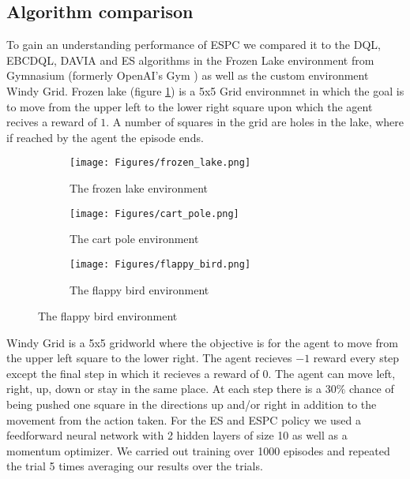\subsection{Algorithm comparison}
To gain an understanding performance of ESPC we compared it to the DQL, EBCDQL, DAVIA and ES algorithms in the Frozen Lake environment from Gymnasium (formerly OpenAI's Gym \cite{Gym}) as well as the custom environment Windy Grid. Frozen lake (figure \ref{fig:FrozenLake}) is a 5x5 Grid environmnet in which the goal is to move from the upper left to the lower right square upon which the agent recives a reward of $1$. A number of squares in the grid are holes in the lake, where if reached by the agent the episode ends. 

\begin{figure}
    \centering
    \begin{subfigure}{0.4\textwidth}
        \centering
        \texttt{[image: Figures/frozen\_lake.png]}
        \caption{The frozen lake environment}
        \label{fig:FrozenLake}
    \end{subfigure}
    \begin{subfigure}{0.4\textwidth}
        \centering
        \texttt{[image: Figures/cart\_pole.png]}
        \caption{The cart pole environment}
        \label{fig:CartPole}
    \end{subfigure}
    \begin{subfigure}{0.5\textwidth}
        \centering
        \texttt{[image: Figures/flappy\_bird.png]}
        \caption{The flappy bird environment}
        \label{fig:FlappyBird}
    \end{subfigure}
\end{figure}

Windy Grid is a 5x5 gridworld where the objective is for the agent to move from the upper left square to the lower right. The agent recieves $-1$ reward every step except the final step in which it recieves a reward of $0$. The agent can move left, right, up, down or stay in the same place. At each step there is a $30\%$ chance of being pushed one square in the directions up and/or right in addition to the movement from the action taken. For the ES and ESPC policy we used a feedforward neural network with 2 hidden layers of size 10 as well as a momentum optimizer.
We carried out training over 1000 episodes and repeated the trial 5 times averaging our results over the trials. 

